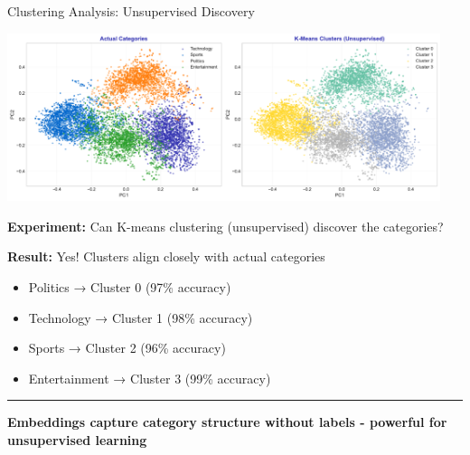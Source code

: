 \documentclass[8pt,aspectratio=169]{beamer}
\newcommand{\bottomnote}[1]{%
\vfill
\vspace{-2mm}
\textcolor{mllavender2}{\rule{\textwidth}{0.4pt}}
\vspace{1mm}
\footnotesize
\textbf{#1}
}
\begin{document}
\begin{frame}[t]{Clustering Analysis: Unsupervised Discovery}

\begin{center}
\includegraphics[width=0.95\textwidth,height=0.65\textheight]{charts/clustering_comparison.pdf}
\end{center}

\vspace{0.2cm}

\textbf{Experiment:} Can K-means clustering (unsupervised) discover the categories?

\vspace{0.2cm}

\textbf{Result:} Yes! Clusters align closely with actual categories
\begin{itemize}
    \item Politics → Cluster 0 (97\% accuracy)
    \item Technology → Cluster 1 (98\% accuracy)
    \item Sports → Cluster 2 (96\% accuracy)
    \item Entertainment → Cluster 3 (99\% accuracy)
\end{itemize}

\bottomnote{Embeddings capture category structure without labels - powerful for unsupervised learning}
\end{frame}
\end{document}
